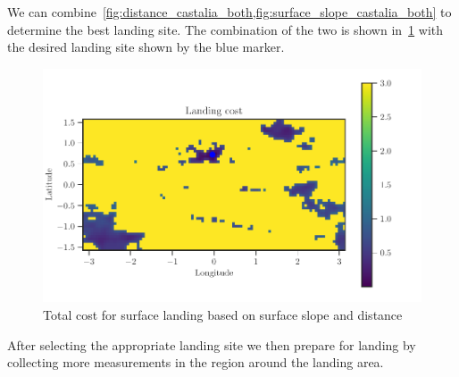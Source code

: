 We can combine~\cref{fig:distance_castalia_both,fig:surface_slope_castalia_both} to determine the best landing site. 
The combination of the two is shown in~\cref{fig:landing_site_cost} with the desired landing site shown by the blue marker.
\begin{figure}[htbp]
    \centering
    \includegraphics[width=\textwidth,keepaspectratio]{figures/computational_geometry/dynamic_exploration/castalia/refine/cost.pdf}
    \caption{Total cost for surface landing based on surface slope and distance\label{fig:landing_site_cost}}
\end{figure}
After selecting the appropriate landing site we then prepare for landing by collecting more measurements in the region around the landing area.

